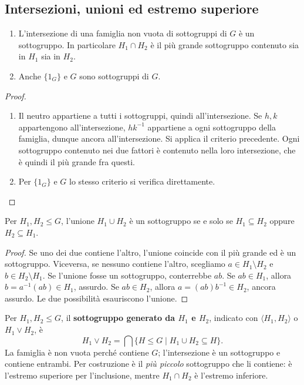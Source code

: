 \subsection{Intersezioni, unioni ed estremo superiore}
\begin{proposizione}\label{prop:intersezione-sottogruppi}
\begin{enumerate}[label=\arabic*.]
\item L'intersezione di una famiglia non vuota di sottogruppi di $G$ è un sottogruppo. In particolare $H_1\cap H_2$ è il più grande sottogruppo contenuto sia in $H_1$ sia in $H_2$.
\item Anche $\{1_G\}$ e $G$ sono sottogruppi di $G$.
\end{enumerate}
\end{proposizione}
\begin{proof}
\begin{enumerate}[label=\arabic*.]
\item Il neutro appartiene a tutti i sottogruppi, quindi all'intersezione. Se $h,k$ appartengono all'intersezione, $hk^{-1}$ appartiene a ogni sottogruppo della famiglia, dunque ancora all'intersezione. Si applica il criterio precedente. Ogni sottogruppo contenuto nei due fattori è contenuto nella loro intersezione, che è quindi il più grande fra questi.
\item Per $\{1_G\}$ e $G$ lo stesso criterio si verifica direttamente.
\end{enumerate}
\end{proof}

\begin{proposizione}\label{prop:unione-sottogruppi}
Per $H_1,H_2\le G$, l'unione $H_1\cup H_2$ è un sottogruppo se e solo se $H_1\subseteq H_2$ oppure $H_2\subseteq H_1$.
\end{proposizione}
\begin{proof}
Se uno dei due contiene l'altro, l'unione coincide con il più grande ed è un sottogruppo. Viceversa, se nessuno contiene l'altro, scegliamo $a\in H_1\setminus H_2$ e $b\in H_2\setminus H_1$. Se l'unione fosse un sottogruppo, conterrebbe $ab$. Se $ab\in H_1$, allora $b=a^{-1}(ab)\in H_1$, assurdo. Se $ab\in H_2$, allora $a=(ab)b^{-1}\in H_2$, ancora assurdo. Le due possibilità esauriscono l'unione.
\end{proof}

\begin{definizione}
Per $H_1,H_2\le G$, il \textbf{sottogruppo generato da $H_1$ e $H_2$}, indicato con $\langle H_1,H_2\rangle$ o $H_1\vee H_2$, è
\[
H_1\vee H_2=\bigcap\{H\le G\mid H_1\cup H_2\subseteq H\}.
\]
La famiglia è non vuota perché contiene $G$; l'intersezione è un sottogruppo e contiene entrambi. Per costruzione è il \emph{più piccolo} sottogruppo che li contiene: è l'estremo superiore per l'inclusione, mentre $H_1\cap H_2$ è l'estremo inferiore.
\end{definizione}

